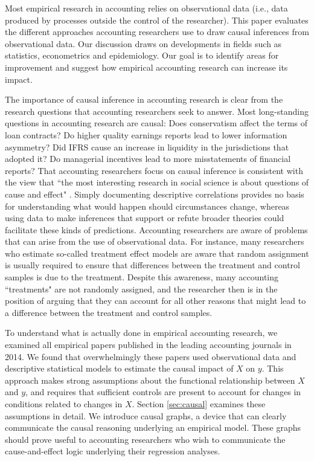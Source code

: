 \documentclass[11pt,reqno,titlepage]{amsart}
\begin{document}
\begin{doublespace} 
Most empirical research in accounting relies on observational data (i.e., data produced by processes outside the control of the researcher).
This paper evaluates the different approaches accounting researchers use to draw causal inferences from observational data. 
Our discussion draws on developments in 
fields such as statistics, econometrics and epidemiology. Our goal is to identify areas for improvement and suggest how empirical accounting research can increase its impact.

The importance of causal inference in accounting research is clear from the research questions that accounting researchers seek to answer. 
Most long-standing questions in accounting research are causal: 
Does conservatism affect the terms of loan contracts?
Do higher quality earnings reports lead to lower information asymmetry? 
Did IFRS cause an increase in liquidity in the jurisdictions that adopted it?
Do managerial incentives lead to more misstatements of financial reports?
That accounting researchers focus on causal inference is consistent with the view that ``the most interesting research in social science is about questions of cause and effect" \cite[p. 3]{Angrist:2008vk}.
Simply documenting descriptive correlations provides no basis for understanding what would happen should circumstances change, 
whereas using data to make inferences that support or refute broader theories could facilitate these kinds of predictions.
Accounting researchers are aware of problems that can arise from the use of observational data.
For instance, many researchers who estimate so-called treatment effect models are aware that random assignment is usually required to ensure that differences between the treatment and control samples is due to the treatment. 
Despite this awareness, many accounting ``treatments" are not randomly assigned, and the researcher then is in the position of arguing that they can account for all other reasons that might lead to a difference between the treatment and control samples.

To understand what is actually done in empirical accounting research, we examined all empirical papers published in the leading accounting journals in 2014. 
We found that overwhelmingly these papers used observational data and descriptive statistical models to estimate the causal impact of $X$ on $y$. 
This approach makes strong assumptions about the functional relationship between $X$ and $y$, and requires that sufficient controls are present to account for changes in conditions related to changes in $X$.
Section \ref{sec:causal} examines these assumptions in detail.
We introduce causal graphs, a device that can clearly communicate the causal reasoning underlying an empirical model.
These graphs should prove useful to accounting researchers who wish to communicate the cause-and-effect logic underlying their regression analyses.


\end{doublespace}
\end{document}
